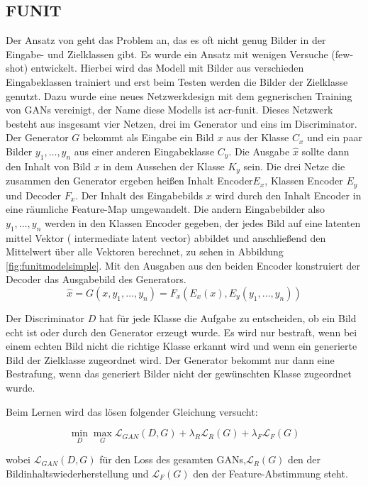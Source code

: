  \subsection{FUNIT}%
 \label{sub:funit}
 Der Ansatz von \citeauthor{liu2019few} \cite{liu2019few}  geht das Problem an, das es oft nicht genug Bilder in der Eingabe- und Zielklassen gibt. Es wurde ein Ansatz mit wenigen Versuche (few-shot) entwickelt. Hierbei wird das Modell mit Bilder aus verschieden Eingabeklassen trainiert und erst beim Testen werden die Bilder der Zielklasse genutzt.
 Dazu wurde eine neues Netzwerkdesign mit dem gegnerischen Training von GANs vereinigt, der Name diese Modells ist  \acrfull{acr-funit}. Dieses Netzwerk besteht aus insgesamt vier Netzen, drei im Generator und eins im Discriminator. Der Generator $G$ bekommt als Eingabe ein Bild $x$ aus der Klasse $C_x$ und ein paar Bilder $y_1,\dots,y_n$ aus einer anderen Eingabeklasse $C_y$. Die Ausgabe $\hat{x}$ sollte dann den Inhalt von Bild $x$ in dem Aussehen der Klasse $K_y$ sein. 
 Die drei Netze die zusammen den Generator ergeben heißen Inhalt Encoder$E_x$, Klassen Encoder $E_y$ und Decoder $F_x$.
 Der Inhalt des Eingabebilds $x$ wird durch den Inhalt Encoder in eine räumliche Feature-Map umgewandelt. Die andern Eingabebilder also  $y_1,\dots,y_n$ werden in den Klassen Encoder gegeben, der  jedes Bild auf eine latenten mittel Vektor ( intermediate latent vector) abbildet und anschließend den Mittelwert über alle Vektoren berechnet, zu sehen in Abbildung \ref{fig:funitmodelsimple}. 
 Mit den Ausgaben aus den beiden Encoder konstruiert der Decoder das Ausgabebild des Generators. 
 \[\hat{x} = G(x, y_1,\dots,y_n)= F_x(E_x(x), E_y(y_1,\dots,y_n))\]
 
 Der Discriminator $D$ hat für jede Klasse die Aufgabe zu entscheiden, ob ein Bild echt ist oder durch den Generator erzeugt wurde. Es wird nur bestraft, wenn bei einem echten Bild nicht die richtige Klasse erkannt wird und wenn ein generierte Bild der Zielklasse zugeordnet wird. Der Generator bekommt nur dann eine Bestrafung, wenn das generiert Bilder nicht der gewünschten Klasse zugeordnet wurde.
 
 Beim Lernen wird das lösen folgender Gleichung versucht:
 
 \[\min_{D} \max_{G} \mathcal{L}_{GAN}(D,G) + \lambda_R \mathcal{L}_R(G) + \lambda_F \mathcal{L}_{F}(G) \]
 
 wobei $ \mathcal{L}_{GAN}(D,G)$ für den Loss des gesamten GANs,$ \mathcal{L}_R(G)$ den der Bildinhaltswiederherstellung und $\mathcal{L}_{F}(G) $ den der Feature-Abstimmung  steht. 
 
